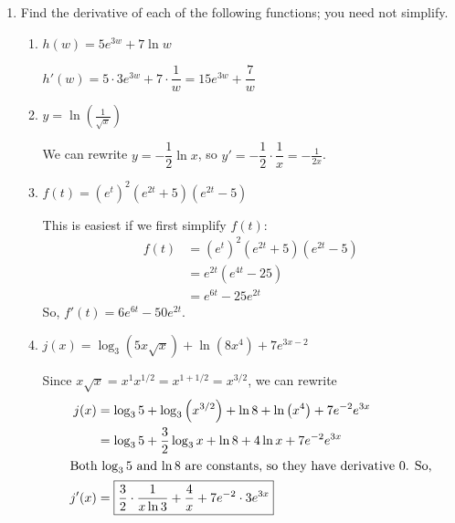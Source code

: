 \documentclass{article}
\theoremstyle{theorem}
\begin{document}
\begin{enumerate}[resume]
\item 

  Find the derivative of each of the following functions; you need not simplify. 

  \begin{enumerate}
  \item
    \begin{problem}
      $h(w) = 5 e^{3w} + 7 \ln w$
    \end{problem}

    \begin{solution}
      $h'(w) = 5 \cdot 3e^{3w} + 7 \cdot \dfrac{1}{w} = \boxed{15 e^{3w} + \dfrac{7}{w}}$
    \end{solution}

  \item
    \begin{problem}
      $y = \displaystyle \ln \left( \frac{1}{\sqrt{x}} \right)$
    \end{problem}

    \begin{solution}
      We can rewrite $y = - \dfrac{1}{2} \ln x$, so $y' = - \dfrac{1}{2} \cdot \dfrac{1}{x} = \boxed{ - \frac{1}{2x}}$.
    \end{solution}

  \item
    \begin{problem}
      $f(t) = (e^t)^2 (e^{2t} + 5)(e^{2t} - 5)$
    \end{problem}

    \begin{solution}
      This is easiest if we first simplify $f(t)$:
      \begin{align*}
        f(t) &= (e^t)^2 (e^{2t} + 5)(e^{2t} - 5) \\
        &= e^{2t} \left( e^{4t} - 25 \right) \\
        &= e^{6t} - 25 e^{2t}
      \end{align*}
      So, $f'(t) = \boxed{6 e^{6t} - 50 e^{2t}}$. 
    \end{solution}

  \item
    \begin{problem}
      $j(x) = \log_3 \left( 5 x \sqrt{x} \right) + \ln(8x^4) + 7e^{3x - 2}$
    \end{problem}

    \begin{solution}
      Since $x \sqrt{x} = x^1 x^{1/2} = x^{1 + 1/2} = x^{3/2}$, we can rewrite
      \begin{align*}
        j(x) &= \log_3 5 + \log_3 \left( x^{3/2} \right) + \ln 8 + \ln \left( x^4 \right) + 7 e^{-2}  e^{3x} \\
        &= \log_3 5 + \frac{3}{2} \log_3 x + \ln 8 + 4 \ln x + 7e^{-2} e^{3x} \\
        \intertext{Both $\log_3 5$ and $\ln 8$ are constants, so they have derivative 0. So,} %
        j'(x) &= \boxed{\frac{3}{2} \cdot \frac{1}{x \ln 3} + \frac{4}{x} + 7e^{-2} \cdot 3e^{3x}}
      \end{align*}
    \end{solution}


\end{enumerate}
\end{enumerate}
\end{document}
